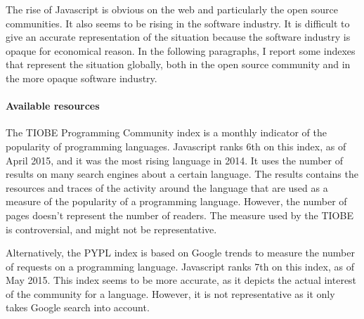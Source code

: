 





The rise of Javascript is obvious on the web and particularly the open source communities.
It also seems to be rising in the software industry.
It is difficult to give an accurate representation of the situation because the software industry is opaque for economical reason.
In the following paragraphs, I report some indexes that represent the situation globally, both in the open source community and in the more opaque software industry.

\paragraph{Available resources}

The TIOBE Programming Community index is a monthly indicator of the popularity of programming languages.
Javascript ranks 6th on this index, as of April 2015, and it was the most rising language in 2014.
It uses the number of results on many search engines about a certain language.
The results contains the resources and traces of the activity around the language that are used as a measure of the popularity of a programming language.
However, the number of pages doesn't represent the number of readers.
The measure used by the TIOBE is controversial, and might not be representative.

Alternatively, the PYPL index is based on Google trends to measure the number of requests on a programming language.
Javascript ranks 7th on this index, as of May 2015.
This index seems to be more accurate, as it depicts the actual interest of the community for a language.
However, it is not representative as it only takes Google search into account.

